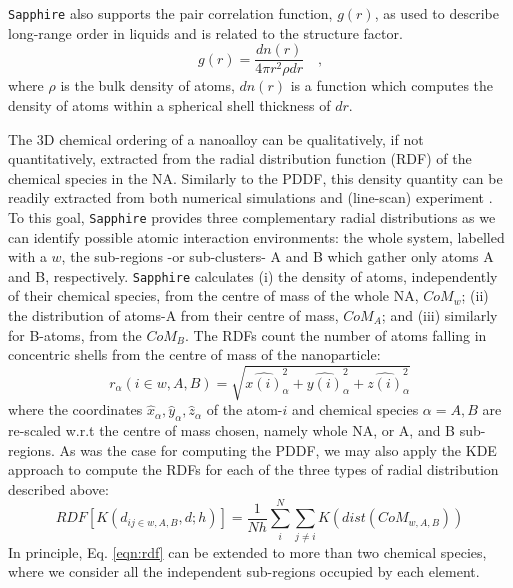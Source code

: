 \texttt{Sapphire} also supports the pair correlation function, $g(r)$, as used to describe long-range order in liquids \cite{10.1039/9781847558237} and is related to the structure factor.
%
\begin{equation}
    g\left( r \right) = \frac{ dn\left( r \right) }{ 4\pi r^{2}\rho dr } \mbox{~~~,}
    \label{eqn:gofr}
\end{equation}
%
where $\rho$ is the bulk density of atoms, $dn(r)$ is a function which computes the density of atoms within a spherical shell thickness of $dr$.


The 3D chemical ordering of a nanoalloy can be qualitatively, if not quantitatively, extracted from the radial distribution function (RDF) of the chemical species in the NA. %
Similarly to the PDDF, this density quantity can be readily extracted from both numerical simulations and (line-scan) experiment \cite{Neder_2005}.
%
To this goal, \texttt{Sapphire} provides three complementary radial distributions as we can identify possible atomic interaction environments: the whole system, labelled with a $w$, the sub-regions -or sub-clusters- A and B which gather only atoms A and B, respectively. \texttt{Sapphire} calculates (i) the density of atoms, independently of their chemical species, from the centre of mass of the whole NA, $CoM_w$; (ii) the distribution of atoms-A from their centre of mass, $CoM_A$; and (iii) similarly for B-atoms, from the $CoM_B$. 
%
The RDFs count the number of atoms falling in concentric shells from the centre of mass of the nanoparticle:
\begin{equation}
    r_{\alpha}(i \in w, A, B) = \sqrt{\hat{x(i)}_{\alpha}^2 + \hat{y(i)}_{\alpha}^2 + \hat{z(i)}_{\alpha}^2}
\end{equation}
where the coordinates $\hat{x}_{\alpha},\hat{y}_{\alpha},\hat{z}_{\alpha}$ of the atom-$i$ and chemical species $\alpha = A,B$ are re-scaled w.r.t the centre of mass chosen, namely whole NA, or A, and B sub-regions.
%
As was the case for computing the PDDF, we may also apply the KDE approach to compute the RDFs for each of the three types of radial distribution described above:
%
\begin{equation}
    RDF\left[K\left(d_{ij \in w, A, B},d;h\right)\right] = \frac{1}{Nh} \sum_{i}^{N} \sum_{j\neq i} K\left( dist (CoM_{w, A, B}) \right)
    \label{eqn:rdf}
\end{equation}
%
In principle, Eq. \ref{eqn:rdf} can be extended to more than two chemical species, where we consider all the independent sub-regions occupied by each element.
%


